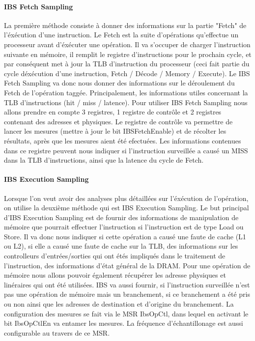 			\paragraph{IBS Fetch Sampling}
			La première méthode consiste à donner des informations sur la partie "Fetch" de l'éxécution d'une instruction. Le Fetch est la suite d'opérations qu'effectue un processeur avant d'éxécuter une opération. Il va s'occuper de charger l'instruction suivante en mémoire, il remplit le registre d'instructions pour le prochain cycle, et par conséquent met à jour la TLB d'instruction du processeur (ceci fait partie du cycle déxécution d'une instruction, Fetch / Décode / Memory / Execute). Le IBS Fetch Sampling va donc nous donner des informations sur le déroulement du Fetch de l'opération taggée. Principalement, les informations utiles concernant la TLB d'instructions (hit / miss / latence). Pour utiliser IBS Fetch Sampling nous allons prendre en compte 3 registres, 1 registre de contrôle et 2 registres contenant des adresses et physiques. Le registre de contrôle va permettre de lancer les mesures (mettre à jour le bit IBSFetchEnable) et de récolter les résultats, après que les mesures aient été efectuées. Les informations contenues dans ce registre peuvent nous indiquer si l'instruction surveillée a causé un MISS dans la TLB d'instructions, ainsi que la latence du cycle de Fetch.\\
			\paragraph{IBS Execution Sampling}
			Lorsque l'on veut avoir des analyses plus détaillées sur l'éxécution de l'opération, on utilise la deuxième méthode qui est IBS Execution Sampling. 			Le but principal d'IBS Execution Sampling est de fournir des informations de manipulation de mémoire que pourrait effectuer l'instruction si l'instruction est de type Load ou Store. Il va donc nous indiquer si cette opération a causé une faute de cache (L1 ou L2), si elle a causé une faute de cache sur la TLB, des informations sur les controlleurs d'entrées/sorties qui ont étés impliqués dans le traitement de l'instruction, des informations d'état général de la DRAM. Pour une opération de mémoire nous allons pouvoir également récupérer les adresse physiques et linéraires qui ont été utilisées. IBS va aussi fournir, si l'instruction surveillée n'est pas une opération de mémoire mais un branchement, si ce branchement a été pris ou non ainsi que les adresses de destination et d'origine du branchement. La configuration des mesures se fait via le MSR IbsOpCtl, dans lequel en activant le bit IbsOpCtlEn va entamer les mesures. La fréquence d'échantillonage est aussi configurable au travers de ce MSR. 
